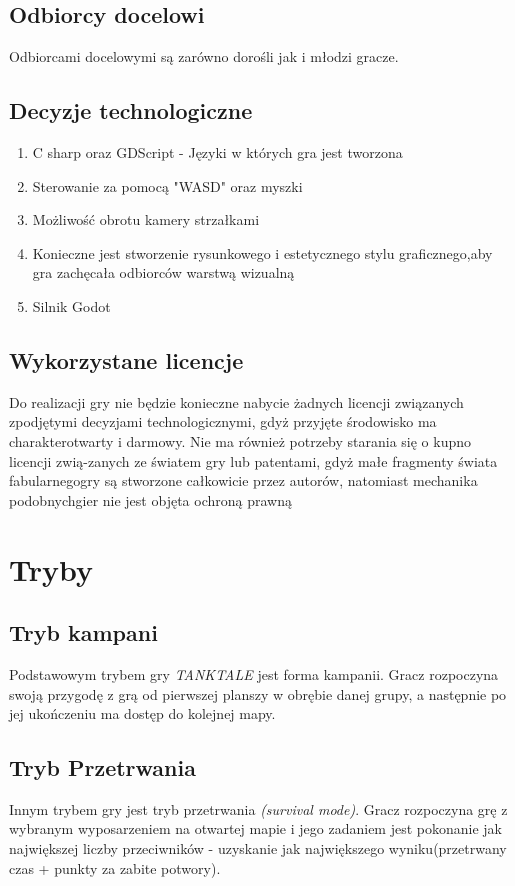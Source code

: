 \documentclass{article}
\begin{document}
    \subsection{Odbiorcy docelowi}
    Odbiorcami docelowymi są zarówno dorośli jak i młodzi gracze.
    \subsection{Decyzje technologiczne}
    \begin{enumerate}
       \item C sharp oraz GDScript - Języki w których gra jest tworzona
       
    \item Sterowanie za pomocą "WASD" oraz myszki
     \item Możliwość obrotu kamery strzałkami
     \item Konieczne  jest  stworzenie  rysunkowego  i  estetycznego  stylu  graficznego,aby gra zachęcała odbiorców warstwą wizualną \item Silnik Godot
\end{enumerate}

\subsection{Wykorzystane licencje}
Do  realizacji  gry  nie  będzie  konieczne  nabycie  żadnych  licencji  związanych  zpodjętymi decyzjami technologicznymi, gdyż przyjęte środowisko ma charakterotwarty i darmowy. Nie ma również potrzeby starania się o kupno licencji zwią-zanych ze światem gry lub patentami, gdyż małe fragmenty świata fabularnegogry  są  stworzone  całkowicie  przez  autorów,  natomiast  mechanika  podobnychgier nie jest objęta ochroną prawną
\newpage

\section{Tryby}
    \subsection{Tryb kampani}
Podstawowym trybem gry \emph{TANKTALE} jest forma kampanii. Gracz rozpoczyna swoją przygodę z grą od pierwszej planszy w obrębie danej grupy, a następnie po jej ukończeniu ma dostęp do kolejnej mapy.
    \subsection{Tryb Przetrwania}
Innym trybem gry jest tryb przetrwania \emph{(survival mode)}. Gracz rozpoczyna grę z wybranym wyposarzeniem na otwartej mapie i jego zadaniem jest pokonanie jak największej liczby przeciwników - uzyskanie jak największego wyniku(przetrwany czas + punkty za zabite potwory).
    \newpage
    
\end{document}
